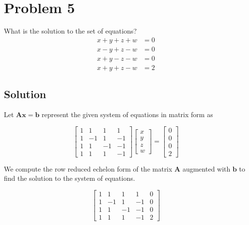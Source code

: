 \section*{Problem 5}

What is the solution to the set of equations?
\begin{align*}
    x + y + z + w & = 0 \\
    x - y + z - w & = 0 \\
    x + y - z - w & = 0 \\
    x + y + z - w & = 2
\end{align*}

\subsection*{Solution}

Let \( \mathbf{A}\mathbf{x} = \mathbf{b} \) represent the given system of equations in matrix form as

\begin{equation*}
    \begin{bmatrix}
        1 & 1  & 1  & 1  \\
        1 & -1 & 1  & -1 \\
        1 & 1  & -1 & -1 \\
        1 & 1  & 1  & -1
    \end{bmatrix}
    \begin{bmatrix}
        x \\
        y \\
        z \\
        w
    \end{bmatrix}
    =
    \begin{bmatrix}
        0 \\
        0 \\
        0 \\
        2
    \end{bmatrix}
\end{equation*}

We compute the row reduced echelon form of the matrix \( \mathbf{A} \) augmented with \( \mathbf{b} \) to find the solution to the system of equations.

\begin{equation*}
    \begin{bmatrix}
        1 & 1  & 1  & 1  & 0 \\
        1 & -1 & 1  & -1 & 0 \\
        1 & 1  & -1 & -1 & 0 \\
        1 & 1  & 1  & -1 & 2
    \end{bmatrix}
\end{equation*}

